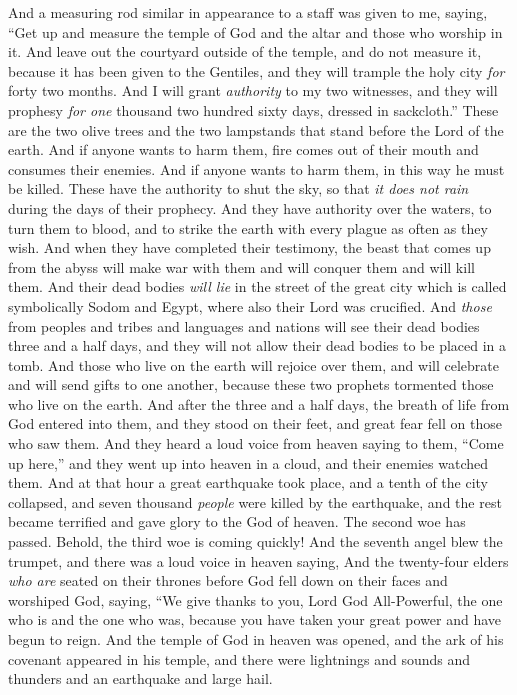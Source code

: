 \begin{biblechapter} %
 And a measuring rod similar in appearance to a staff was given to me, saying, “Get up and measure the temple of God and the altar and those who worship in it.
\verse And leave out the courtyard outside of the temple, and do not measure it, because it has been given to the Gentiles, and they will trample the holy city \textit{for} forty two months.
\verse And I will grant \textit{authority} to my two witnesses, and they will prophesy \textit{for one} thousand two hundred sixty days, dressed in sackcloth.”
\verse These are the two olive trees and the two lampstands that stand before the Lord of the earth.
\verse And if anyone wants to harm them, fire comes out of their mouth and consumes their enemies. And if anyone wants to harm them, in this way he must be killed.
\verse These have the authority to shut the sky, so that \textit{it does not rain} during the days of their prophecy. And they have authority over the waters, to turn them to blood, and to strike the earth with every plague as often as they wish.
\verse And when they have completed their testimony, the beast that comes up from the abyss will make war with them and will conquer them and will kill them.
\verse And their dead bodies \textit{will lie} in the street of the great city which is called symbolically Sodom and Egypt, where also their Lord was crucified.
\verse And \textit{those} from peoples and tribes and languages and nations will see their dead bodies three and a half days, and they will not allow their dead bodies to be placed in a tomb.
\verse And those who live on the earth will rejoice over them, and will celebrate and will send gifts to one another, because these two prophets tormented those who live on the earth.
\verse And after the three and a half days, the breath of life from God entered into them, and they stood on their feet, and great fear fell on those who saw them.
\verse And they heard a loud voice from heaven saying to them, “Come up here,” and they went up into heaven in a cloud, and their enemies watched them.
\verse And at that hour a great earthquake took place, and a tenth of the city collapsed, and seven thousand \textit{people} were killed by the earthquake, and the rest became terrified and gave glory to the God of heaven.
\verse The second woe has passed. Behold, the third woe is coming quickly!
 And the seventh angel blew the trumpet, and there was a loud voice in heaven saying,
\verse And the twenty-four elders \textit{who are} seated on their thrones before God fell down on their faces and worshiped God,
\verse saying,
\verse “We give thanks to you, Lord God All-Powerful, 
the one who is and the one who was, 
because you have taken your great power 
and have begun to reign.
\verse And the temple of God in heaven was opened, and the ark of his covenant appeared in his temple, and there were lightnings and sounds and thunders and an earthquake and large hail.
\end{biblechapter}

